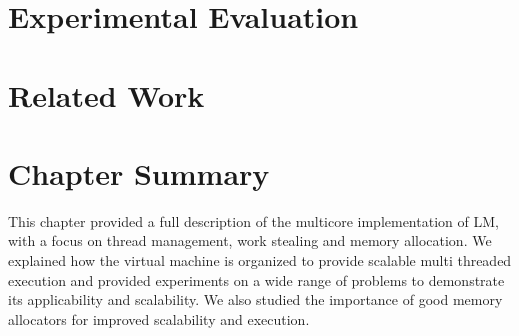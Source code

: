 \section{Experimental Evaluation}


\section{Related Work}


\section{Chapter Summary}

This chapter provided a full description of the multicore implementation of LM,
with a focus on thread management, work stealing and memory allocation.  We
explained how the virtual machine is organized to provide scalable multi
threaded execution and provided experiments on a wide range of problems to
demonstrate its applicability and scalability. We also studied the importance of
good memory allocators for improved scalability and execution.
